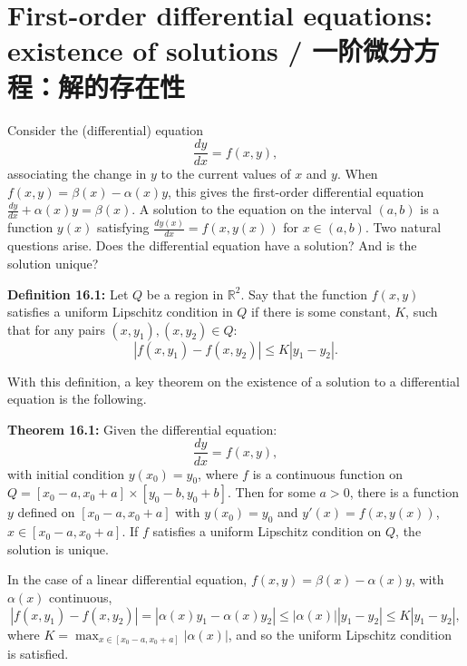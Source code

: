 \section{First-order differential equations: existence of solutions / 一阶微分方程：解的存在性}

\begin{original}
Consider the (differential) equation
\[
\frac{dy}{dx} = f(x, y),
\]
associating the change in $y$ to the current values of $x$ and $y$. When $f(x, y) = \beta(x) - \alpha(x) y$, this gives the first-order differential equation $\frac{dy}{dx} + \alpha(x)y = \beta(x)$. A solution to the equation on the interval $(a, b)$ is a function $y(x)$ satisfying $\frac{d y(x)}{dx} = f(x, y(x))$ for $x \in (a, b)$. Two natural questions arise. Does the differential equation have a solution? And is the solution unique?

\textbf{Definition 16.1:} Let $Q$ be a region in $\mathbb{R}^2$. Say that the function $f(x, y)$ satisfies a uniform Lipschitz condition in $Q$ if there is some constant, $K$, such that for any pairs $(x, y_1), (x, y_2) \in Q$:
\[
|f(x, y_1) - f(x, y_2)| \leq K |y_1 - y_2|.
\]

With this definition, a key theorem on the existence of a solution to a differential equation is the following.

\textbf{Theorem 16.1:} Given the differential equation:
\[
\frac{dy}{dx} = f(x, y),
\]
with initial condition $y(x_0) = y_0$, where $f$ is a continuous function on $Q = [x_0 - a, x_0 + a] \times [y_0 - b, y_0 + b]$. Then for some $a > 0$, there is a function $y$ defined on $[x_0 - a, x_0 + a]$ with $y(x_0) = y_0$ and $y'(x) = f(x, y(x))$, $x \in [x_0 - a, x_0 + a]$. If $f$ satisfies a uniform Lipschitz condition on $Q$, the solution is unique.

In the case of a linear differential equation, $f(x, y) = \beta(x) - \alpha(x)y$, with $\alpha(x)$ continuous,
\[
|f(x, y_1) - f(x, y_2)| = |\alpha(x)y_1 - \alpha(x)y_2| \leq |\alpha(x)| |y_1 - y_2| \leq K |y_1 - y_2|,
\]
where $K = \max_{x \in [x_0-a, x_0+a]} |\alpha(x)|$, and so the uniform Lipschitz condition is satisfied.
\end{original}
